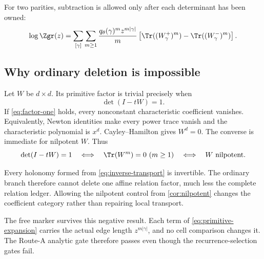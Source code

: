 For two parities, subtraction is allowed only after each determinant has been
owned:
\begin{equation}
  \log\Zgr(z)
  =\sum_{[\gamma]}\sum_{m\ge1}
  \frac{q_\theta(\gamma)^m z^{m|\gamma|}}{m}
  \left[\Tr((W_\gamma^+)^m)-\Tr((W_\gamma^-)^m)\right].
  \label{eq:graded-expansion}
\end{equation}

\subsection{Why ordinary deletion is impossible}

Let $W$ be $d\times d$.  Its primitive factor is trivial precisely when
\begin{equation}
  \det(I-tW)=1.
  \label{eq:factor-one}
\end{equation}
If \cref{eq:factor-one} holds, every nonconstant characteristic coefficient
vanishes.  Equivalently, Newton identities make every power trace vanish and
the characteristic polynomial is $x^d$.  Cayley--Hamilton gives $W^d=0$.
The converse is immediate for nilpotent $W$.  Thus
\begin{equation}
  \det(I-tW)=1
  \quad\Longleftrightarrow\quad
  \Tr(W^m)=0\ (m\ge1)
  \quad\Longleftrightarrow\quad
  W\ \text{nilpotent}.
  \label{eq:nilpotence}
\end{equation}

Every holonomy formed from \cref{eq:inverse-transport} is invertible.  The
ordinary branch therefore cannot delete one affine relation factor, much less
the complete relation ledger.  Allowing the nilpotent control from
\cref{cor:nilpotent} changes the coefficient category rather than repairing
local transport.

The free marker survives this negative result.  Each term of
\cref{eq:primitive-expansion} carries the actual edge length
$z^{m|\gamma|}$, and no cell comparison changes it.  The Route-A analytic
gate therefore passes even though the recurrence-selection gates fail.
